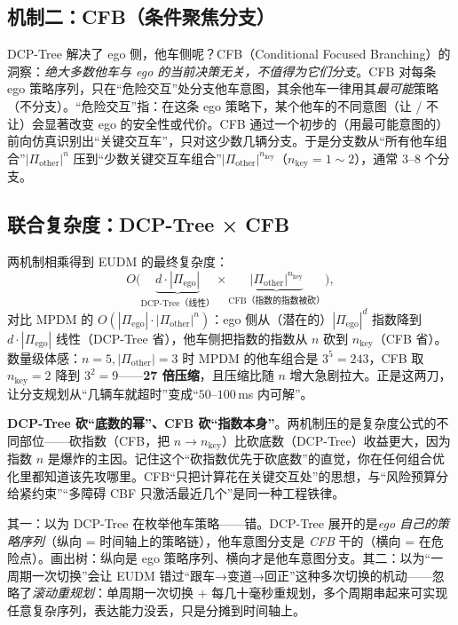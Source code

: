 \subsection{机制二：CFB（条件聚焦分支）}
\label{sec:pr-eudm-cfb}

DCP-Tree 解决了 ego 侧，他车侧呢？CFB（Conditional Focused Branching）的洞察：\emph{绝大多数他车与 ego 的当前决策无关，不值得为它们分支}\cite{zhang2020eudm}。CFB 对每条 ego 策略序列，只在“危险交互”处分支他车意图，其余他车一律用其\emph{最可能}策略（不分支）。“危险交互”指：在这条 ego 策略下，某个他车的不同意图（让 / 不让）会显著改变 ego 的安全性或代价。CFB 通过一个初步的（用最可能意图的）前向仿真识别出“关键交互车”，只对这少数几辆分支。于是分支数从“所有他车组合”$|\Pi_{\mathrm{other}}|^n$ 压到“少数关键交互车组合”$|\Pi_{\mathrm{other}}|^{n_{\mathrm{key}}}$（$n_{\mathrm{key}}=1\sim2$），通常 $3$--$8$ 个分支。

\subsection{联合复杂度：DCP-Tree × CFB}
\label{sec:pr-eudm-joint}

两机制相乘得到 EUDM 的最终复杂度\cite{zhang2020eudm}：
\begin{equation}
  O\big(\underbrace{d\cdot|\Pi_{\mathrm{ego}}|}_{\text{DCP-Tree（线性）}}\times\underbrace{|\Pi_{\mathrm{other}}|^{n_{\mathrm{key}}}}_{\text{CFB（指数的指数被砍）}}\big),
  \label{eq:pr-eudm-complexity}
\end{equation}
对比 MPDM 的 $O(|\Pi_{\mathrm{ego}}|\cdot|\Pi_{\mathrm{other}}|^n)$：ego 侧从（潜在的）$|\Pi_{\mathrm{ego}}|^d$ 指数降到 $d\cdot|\Pi_{\mathrm{ego}}|$ 线性（DCP-Tree 省），他车侧把指数的指数从 $n$ 砍到 $n_{\mathrm{key}}$（CFB 省）。数量级体感：$n=5,|\Pi_{\mathrm{other}}|=3$ 时 MPDM 的他车组合是 $3^5=243$，CFB 取 $n_{\mathrm{key}}=2$ 降到 $3^2=9$——\textbf{27 倍压缩}，且压缩比随 $n$ 增大急剧拉大。正是这两刀，让分支规划从“几辆车就超时”变成“$50$--$100\,$ms 内可解”。

\begin{insight}
\textbf{DCP-Tree 砍“底数的幂”、CFB 砍“指数本身”}。两机制压的是复杂度公式的不同部位——砍指数（CFB，把 $n\to n_{\mathrm{key}}$）比砍底数（DCP-Tree）收益更大，因为指数 $n$ 是爆炸的主因。记住这个“砍指数优先于砍底数”的直觉，你在任何组合优化里都知道该先攻哪里。CFB“只把计算花在关键交互处”的思想，与“风险预算分给紧约束”“多障碍 CBF 只激活最近几个”是同一种工程铁律。
\end{insight}

\begin{pitfall}
其一：以为 DCP-Tree 在枚举他车策略——错。DCP-Tree 展开的是\emph{ego 自己的策略序列}（纵向 = 时间轴上的策略链），他车意图分支是 \emph{CFB} 干的（横向 = 在危险点）。画出树：纵向是 ego 策略序列、横向才是他车意图分支。其二：以为“一周期一次切换”会让 EUDM 错过“跟车→变道→回正”这种多次切换的机动——忽略了\emph{滚动重规划}：单周期一次切换 + 每几十毫秒重规划，多个周期串起来可实现任意复杂序列，表达能力没丢，只是分摊到时间轴上。
\end{pitfall}

